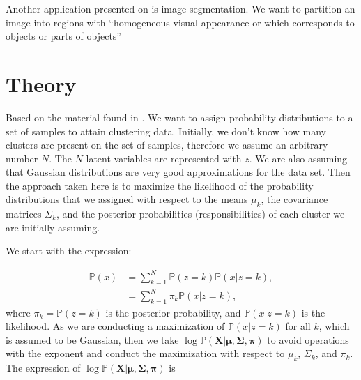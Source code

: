 \documentclass[letterpaper, 10 pt, conference]{ieeeconf}  %
\begin{document}
Another application presented on \cite{GMM_EM} is image segmentation. We want to partition an image into regions with ``homogeneous visual appearance or which corresponds to objects or parts of objects''



\section{Theory}
\label{sec:Theory}

Based on the material found in \cite{GMM_EM}. We want to assign probability distributions to a set of samples to attain 
clustering data. Initially, we don't know how many clusters are present on the set of samples, therefore we assume an 
arbitrary number $N$. The $N$ latent variables are represented with $z$. We are also assuming that Gaussian distributions 
are very good approximations for the data set. Then the approach taken here is to maximize the likelihood of the probability 
distributions that we assigned with respect to the means $\mu_{k}$, the covariance matrices $\Sigma_{k}$, and the posterior 
probabilities (responsibilities) of each cluster we are initially assuming. 

We start with the expression:

\begin{equation*}
\begin{aligned}
 \mathbb{P}(x) &= \sum_{k=1}^{N}  \mathbb{P}(z=k) \mathbb{P}(x | z= k),\\
                             & =  \sum_{k=1}^{N}  \pi_{k} \mathbb{P}(x | z= k),
\end{aligned}
\end{equation*}
where $\pi_{k} = \mathbb{P}(z=k)$ is the posterior probability, and  $\mathbb{P}(x | z= k)$ is the likelihood. As we are conducting
a maximization of $\mathbb{P}(x | z= k)$ for all $k$, which is assumed to be Gaussian, then we take $\log{\mathbb{P}(\mathbf{X} | \mathbf{\mu, \Sigma, \pi})}$ to avoid operations with the exponent and conduct the maximization with respect to $\mu_{k}$, $\Sigma_{k}$, and  $\pi_{k}$. The expression of $\log{\mathbb{P}(\mathbf{X} | \mathbf{\mu, \Sigma, \pi})}$ is
\end{document}
